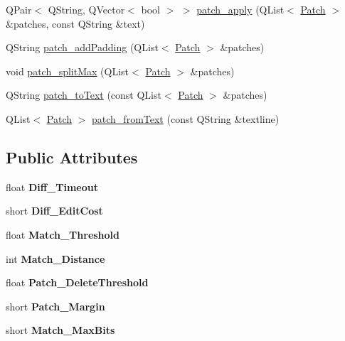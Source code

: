 \begin{DoxyCompactItemize}
\item 
Q\+Pair$<$ Q\+String, Q\+Vector$<$ bool $>$ $>$ \hyperlink{classdiff__match__patch_acbdd755dfb40abc85760b4f8fbcdc98f}{patch\+\_\+apply} (Q\+List$<$ \hyperlink{class_patch}{Patch} $>$ \&patches, const Q\+String \&text)
\item 
Q\+String \hyperlink{classdiff__match__patch_a03d8b23bf20cbfc3e454aad38ff366d8}{patch\+\_\+add\+Padding} (Q\+List$<$ \hyperlink{class_patch}{Patch} $>$ \&patches)
\item 
void \hyperlink{classdiff__match__patch_a8b026488adde70dcc268fc50d170f4e3}{patch\+\_\+split\+Max} (Q\+List$<$ \hyperlink{class_patch}{Patch} $>$ \&patches)
\item 
Q\+String \hyperlink{classdiff__match__patch_ab23a8022e207c5aa2fd2ee7dad604341}{patch\+\_\+to\+Text} (const Q\+List$<$ \hyperlink{class_patch}{Patch} $>$ \&patches)
\item 
Q\+List$<$ \hyperlink{class_patch}{Patch} $>$ \hyperlink{classdiff__match__patch_a2d3d6460ce369b1f506a2c5d6b3fdee9}{patch\+\_\+from\+Text} (const Q\+String \&textline)
\end{DoxyCompactItemize}
\subsection*{Public Attributes}
\begin{DoxyCompactItemize}
\item 
\mbox{\label{classdiff__match__patch_aaa544a91d8555a780ab261fc1c15b3f9}} 
float {\bfseries Diff\+\_\+\+Timeout}
\item 
\mbox{\label{classdiff__match__patch_a3a7134ca63b7e4cb44a2432ef4c34121}} 
short {\bfseries Diff\+\_\+\+Edit\+Cost}
\item 
\mbox{\label{classdiff__match__patch_a4e7c966c7c2a930a578cf7ac8edc0e86}} 
float {\bfseries Match\+\_\+\+Threshold}
\item 
\mbox{\label{classdiff__match__patch_a57c49d8f3692157431ecd74fe6cd3f8f}} 
int {\bfseries Match\+\_\+\+Distance}
\item 
\mbox{\label{classdiff__match__patch_a45ecc3f1f3d865c8b1d1b2eb4f40ab33}} 
float {\bfseries Patch\+\_\+\+Delete\+Threshold}
\item 
\mbox{\label{classdiff__match__patch_a798d3ee5eb9bf60ed679f50fa9a42d9b}} 
short {\bfseries Patch\+\_\+\+Margin}
\item 
\mbox{\label{classdiff__match__patch_aa99b26cfb171f9ca3d558db26c76346c}} 
short {\bfseries Match\+\_\+\+Max\+Bits}
\end{DoxyCompactItemize}
